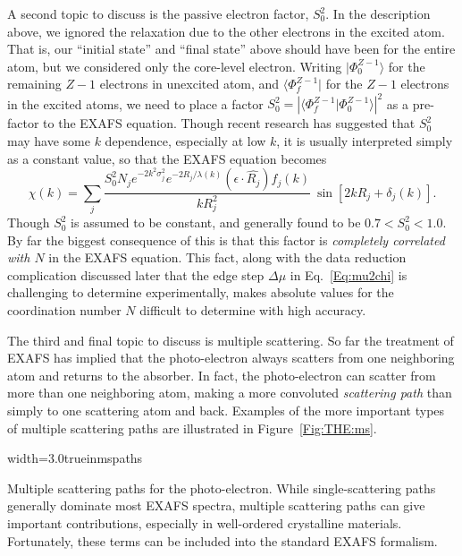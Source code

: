 A second topic to discuss is the passive electron factor, $S_0^2$.  In the
description above, we ignored the relaxation due to the other electrons in
the excited atom.  That is, our ``initial state'' and ``final state'' above
should have been for the entire atom, but we considered only the core-level
electron. Writing ${| \Phi^{Z-1}_0 \rangle }$ for the remaining $Z-1$
electrons in unexcited atom, and ${\langle \Phi^{Z-1}_f|}$ for the $Z-1$
electrons in the excited atoms, we need to place a factor $S_0^2 = {
  |{\langle \Phi^{Z-1}_f |\Phi^{Z-1}_0 \rangle}|^2} $ as a pre-factor to
the EXAFS equation.  Though recent research has suggested that $S_0^2$ may
have some $k$ dependence, especially at low $k$, it is usually interpreted
simply as a constant value, so that the EXAFS equation becomes
\begin{equation}
  \chi(k) = \sum_j {
    {{\frac{S_0^2 N_j e^{-2k^2\sigma_j^2} e^{-2R_j/\lambda(k)}  (\epsilon \cdot \hat{R_j}) f_j(k)}{kR_j^2}}}\>
    \sin[2kR_j + \delta_j(k)] }.
  \label{Eq:xafs_withs02}
\end{equation}
\noindent
Though $S_0^2$ is assumed to be constant, and generally found to be $ 0.7 < S_0^2
< 1.0 $.  By far the biggest consequence of this is that this factor is
{\emph{completely correlated with $N$}} in the EXAFS equation.  This fact,
along with the data reduction complication discussed later that the edge
step $\Delta\mu$ in Eq.~\ref{Eq:mu2chi} is challenging to determine
experimentally, makes absolute values for the coordination number $N$
difficult to determine with high accuracy.


The third and final topic to discuss is multiple scattering. So far the
treatment of EXAFS has implied that the photo-electron always scatters from
one neighboring atom and returns to the absorber.  In fact, the
photo-electron can scatter from more than one neighboring atom, making a
more convoluted {\emph{scattering path}} than simply to one scattering atom
and back.  Examples of the more important types of multiple scattering
paths are illustrated in Figure~\ref{Fig:THE:ms}.

\begin{Nfig}{width=3.0truein}{mspaths}
  \caption{Multiple scattering paths for the photo-electron.  While
    single-scattering paths generally dominate most EXAFS spectra, multiple
    scattering paths can give important contributions, especially in
    well-ordered crystalline materials.  Fortunately, these terms can be
    included into the standard EXAFS formalism.}
  \label{Fig:THE:ms}
\end{Nfig}


